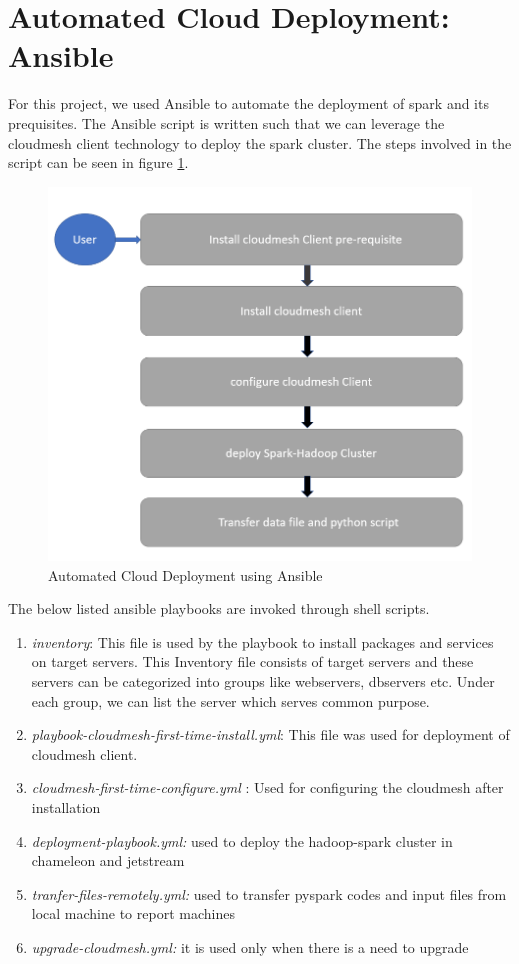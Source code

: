 \documentclass[9pt,twocolumn,twoside]{../../styles/osajnl}
\begin{document}
\section{Automated Cloud Deployment: Ansible}
For this project, we used Ansible to automate the deployment of spark and its prequisites. The Ansible script is written such that we can leverage the cloudmesh client technology to deploy the spark cluster. The steps involved in the script can be seen in figure \ref{fig:ansible}.

\begin{figure}[h]
\centering
\includegraphics[scale = 0.28]{images/auto_deploy}
\caption{Automated Cloud Deployment using Ansible}
\label{fig:ansible}
\end{figure}

The below listed ansible playbooks are invoked through shell scripts.
\begin{enumerate}
\item \textit{inventory}: This file is used by the playbook to install packages and services on target servers. This Inventory file consists of target servers and these servers can be categorized into groups like webservers, dbservers etc. Under each group, we can list the server which serves common purpose.
\item \textit{playbook-cloudmesh-first-time-install.yml}: This file was used for deployment of cloudmesh client.
\item \textit{cloudmesh-first-time-configure.yml} : Used for configuring the cloudmesh after installation

\item \textit{deployment-playbook.yml:} used to deploy the hadoop-spark cluster in chameleon and jetstream

\item  \textit{tranfer-files-remotely.yml:} used to transfer pyspark codes and input files from local machine to report machines

\item \textit{upgrade-cloudmesh.yml:} it is used only when there is a need to upgrade
\end{enumerate}
\end{document}
